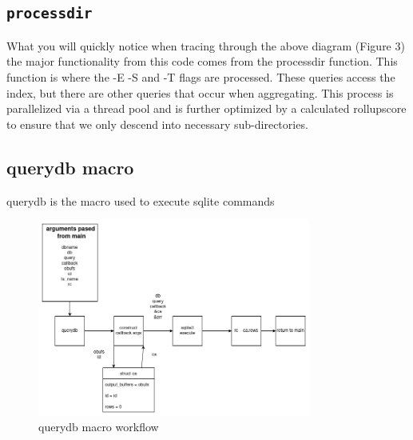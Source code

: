 \subsection{\texttt{processdir}}
What you will quickly notice when tracing through the above diagram (Figure 3) the major functionality from this code comes from the processdir function. This function is where the -E -S and -T flags are processed. These queries access the index, but there are other queries that occur when aggregating. This process is parallelized via a thread pool and is further optimized by a calculated rollupscore to ensure that we only descend into necessary sub-directories.

\subsection{querydb macro}
querydb is the macro used to execute sqlite commands


\begin{figure} [h]
\centering
\includegraphics[width=0.8\textwidth]{images/querydb_macro.png}
\caption{\label{fig:querydb}querydb macro workflow}
\end{figure}


\clearpage